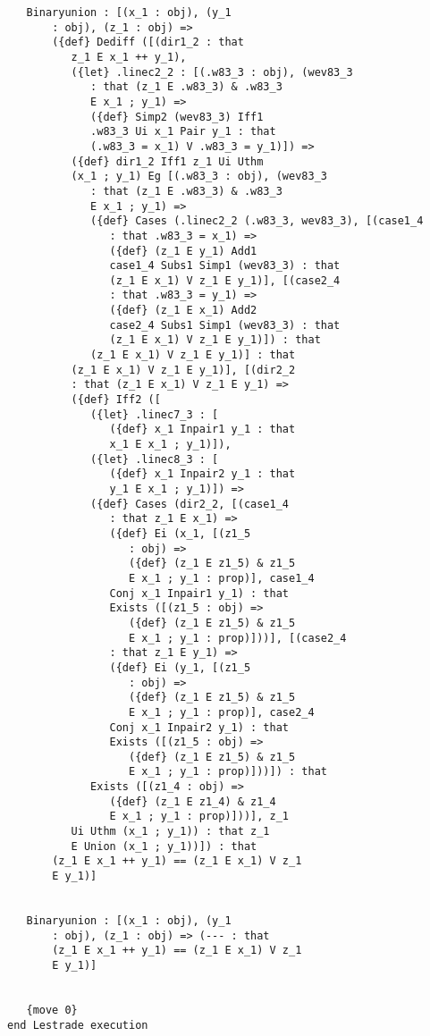 \documentclass[12pt]{article}
\begin{document}
\begin{verbatim}
   Binaryunion : [(x_1 : obj), (y_1 
       : obj), (z_1 : obj) => 
       ({def} Dediff ([(dir1_2 : that 
          z_1 E x_1 ++ y_1), 
          ({let} .linec2_2 : [(.w83_3 : obj), (wev83_3 
             : that (z_1 E .w83_3) & .w83_3 
             E x_1 ; y_1) => 
             ({def} Simp2 (wev83_3) Iff1 
             .w83_3 Ui x_1 Pair y_1 : that 
             (.w83_3 = x_1) V .w83_3 = y_1)]) => 
          ({def} dir1_2 Iff1 z_1 Ui Uthm 
          (x_1 ; y_1) Eg [(.w83_3 : obj), (wev83_3 
             : that (z_1 E .w83_3) & .w83_3 
             E x_1 ; y_1) => 
             ({def} Cases (.linec2_2 (.w83_3, wev83_3), [(case1_4 
                : that .w83_3 = x_1) => 
                ({def} (z_1 E y_1) Add1 
                case1_4 Subs1 Simp1 (wev83_3) : that 
                (z_1 E x_1) V z_1 E y_1)], [(case2_4 
                : that .w83_3 = y_1) => 
                ({def} (z_1 E x_1) Add2 
                case2_4 Subs1 Simp1 (wev83_3) : that 
                (z_1 E x_1) V z_1 E y_1)]) : that 
             (z_1 E x_1) V z_1 E y_1)] : that 
          (z_1 E x_1) V z_1 E y_1)], [(dir2_2 
          : that (z_1 E x_1) V z_1 E y_1) => 
          ({def} Iff2 ([
             ({let} .linec7_3 : [
                ({def} x_1 Inpair1 y_1 : that 
                x_1 E x_1 ; y_1)]), 
             ({let} .linec8_3 : [
                ({def} x_1 Inpair2 y_1 : that 
                y_1 E x_1 ; y_1)]) => 
             ({def} Cases (dir2_2, [(case1_4 
                : that z_1 E x_1) => 
                ({def} Ei (x_1, [(z1_5 
                   : obj) => 
                   ({def} (z_1 E z1_5) & z1_5 
                   E x_1 ; y_1 : prop)], case1_4 
                Conj x_1 Inpair1 y_1) : that 
                Exists ([(z1_5 : obj) => 
                   ({def} (z_1 E z1_5) & z1_5 
                   E x_1 ; y_1 : prop)]))], [(case2_4 
                : that z_1 E y_1) => 
                ({def} Ei (y_1, [(z1_5 
                   : obj) => 
                   ({def} (z_1 E z1_5) & z1_5 
                   E x_1 ; y_1 : prop)], case2_4 
                Conj x_1 Inpair2 y_1) : that 
                Exists ([(z1_5 : obj) => 
                   ({def} (z_1 E z1_5) & z1_5 
                   E x_1 ; y_1 : prop)]))]) : that 
             Exists ([(z1_4 : obj) => 
                ({def} (z_1 E z1_4) & z1_4 
                E x_1 ; y_1 : prop)]))], z_1 
          Ui Uthm (x_1 ; y_1)) : that z_1 
          E Union (x_1 ; y_1))]) : that 
       (z_1 E x_1 ++ y_1) == (z_1 E x_1) V z_1 
       E y_1)]


   Binaryunion : [(x_1 : obj), (y_1 
       : obj), (z_1 : obj) => (--- : that 
       (z_1 E x_1 ++ y_1) == (z_1 E x_1) V z_1 
       E y_1)]


   {move 0}
end Lestrade execution
\end{verbatim}
\end{document}
